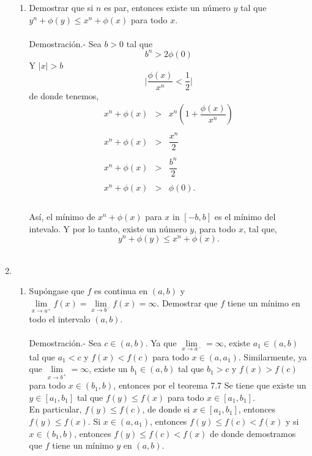 \begin{enumerate}[\bfseries 1.]
\begin{enumerate}[\bfseries (a)]
	\item Demostrar que si $n$ es par, entonces existe un número $y$ tal que $y^n+\phi(y)\leq x^n + \phi(x)$ para todo $x$.\\\\
	    Demostración.-\; Sea $b>0$ tal que 
	    $$b^n>2\phi(0)$$
	    Y $|x|>b$ 
	    $$\bigg|\dfrac{\phi(x)}{x^n}<\dfrac{1}{2}\bigg|$$
	    de donde tenemos,
	    $$\begin{array}{rcl}
		x^n+\phi(x)&>&x^n\left(1+\dfrac{\phi(x)}{x^n}\right)\\\\
		x^n+\phi(x)&>&\dfrac{x^n}{2}\\\\
		x^n+\phi(x)&>&\dfrac{b^n}{2}\\\\
		x^n+\phi(x)&>&\phi(0).\\\\
	    \end{array}$$

	    Así, el mínimo de $x^n+\phi(x)$ para $x$ in $[-b,b]$ es el mínimo del intevalo.
	    Y por lo tanto, existe un número $y$, para todo $x$, tal que,
	    $$y^n+\phi(y)\leq x^n +\phi(x).$$\\

    \end{enumerate}

\item 
    \begin{enumerate}[\bfseries (a)]

	\item Supóngase que $f$ es continua en $(a,b)$ y $\lim\limits_{x\to a^+} f(x)=\lim\limits_{x\to b^-} f(x)=\infty$. Demostrar que $f$ tiene un mínimo en todo el intervalo $(a,b)$.\\\\
	    Demostración.-\; Sea $c\in (a,b)$. Ya que $\lim\limits_{x\to a^-}=\infty$, existe $a_1\in (a,b)$ tal que $a_1<c$ y $f(x)<f(c)$ para todo $x\in (a,a_1)$. Similarmente, ya que $\lim\limits_{x\to b^+}=\infty$, existe un $b_1\in (a,b)$ tal que $b_1>c$ y $f(x)>f(c)$ para todo $x\in (b_1,b)$, entonces por el teorema 7.7  Se tiene que existe un $y\in [a_1,b_1]$ tal que $f(y)\leq f(x)$ para todo $x\in [a_1,b_1]$.\\
	    En particular, $f(y)\leq f(c)$, de donde si $x\in[a_1,b_1]$, entonces $f(y)\leq f(x)$. Si $x\in(a,a_1)$, entonces $f(y)\leq f(c)<f(x)$ y si $x\in (b_1,b)$, entonces $f(y)\leq f(c)<f(x)$ de donde demostramos que $f$ tiene un mínimo $y$  en $(a,b)$.\\\\


\end{enumerate}
\end{enumerate}
